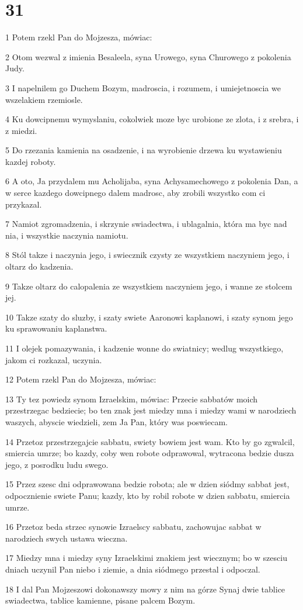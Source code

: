 \chapter{31}

\par 1 Potem rzekl Pan do Mojzesza, mówiac:
\par 2 Otom wezwal z imienia Besaleela, syna Urowego, syna Churowego z pokolenia Judy.
\par 3 I napelnilem go Duchem Bozym, madroscia, i rozumem, i umiejetnoscia we wszelakiem rzemiosle.
\par 4 Ku dowcipnemu wymyslaniu, cokolwiek moze byc urobione ze zlota, i z srebra, i z miedzi.
\par 5 Do rzezania kamienia na osadzenie, i na wyrobienie drzewa ku wystawieniu kazdej roboty.
\par 6 A oto, Ja przydalem mu Acholijaba, syna Achysamechowego z pokolenia Dan, a w serce kazdego dowcipnego dalem madrosc, aby zrobili wszystko com ci przykazal.
\par 7 Namiot zgromadzenia, i skrzynie swiadectwa, i ublagalnia, która ma byc nad nia, i wszystkie naczynia namiotu.
\par 8 Stól takze i naczynia jego, i swiecznik czysty ze wszystkiem naczyniem jego, i oltarz do kadzenia.
\par 9 Takze oltarz do calopalenia ze wszystkiem naczyniem jego, i wanne ze stolcem jej.
\par 10 Takze szaty do sluzby, i szaty swiete Aaronowi kaplanowi, i szaty synom jego ku sprawowaniu kaplanstwa.
\par 11 I olejek pomazywania, i kadzenie wonne do swiatnicy; wedlug wszystkiego, jakom ci rozkazal, uczynia.
\par 12 Potem rzekl Pan do Mojzesza, mówiac:
\par 13 Ty tez powiedz synom Izraelskim, mówiac: Przecie sabbatów moich przestrzegac bedziecie; bo ten znak jest miedzy mna i miedzy wami w narodziech waszych, abyscie wiedzieli, zem Ja Pan, który was poswiecam.
\par 14 Przetoz przestrzegajcie sabbatu, swiety bowiem jest wam. Kto by go zgwalcil, smiercia umrze; bo kazdy, coby wen robote odprawowal, wytracona bedzie dusza jego, z posrodku ludu swego.
\par 15 Przez szesc dni odprawowana bedzie robota; ale w dzien siódmy sabbat jest, odpocznienie swiete Panu; kazdy, kto by robil robote w dzien sabbatu, smiercia umrze.
\par 16 Przetoz beda strzec synowie Izraelscy sabbatu, zachowujac sabbat w narodziech swych ustawa wieczna.
\par 17 Miedzy mna i miedzy syny Izraelskimi znakiem jest wiecznym; bo w szesciu dniach uczynil Pan niebo i ziemie, a dnia siódmego przestal i odpoczal.
\par 18 I dal Pan Mojzeszowi dokonawszy mowy z nim na górze Synaj dwie tablice swiadectwa, tablice kamienne, pisane palcem Bozym.

